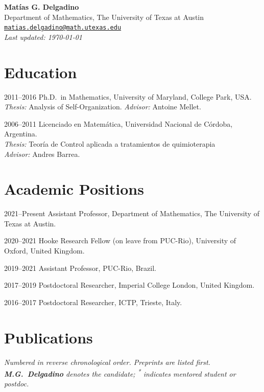 \documentclass[11pt]{article}
\makeatletter
\newcommand{\entry}[2]{%
  \par\addvspace{0.6ex}\noindent
  \begin{list}{}{%
    \setlength{\leftmargin}{1.5in}%
    \setlength{\labelwidth}{1.4in}%
    \setlength{\labelsep}{0.1in}%
  }%
  \item[\textsf{\small #1}] #2
  \end{list}
}
\newcommand{\cvheader}{%
  \begin{center}
    {\LARGE\textbf{Mat\'ias G. Delgadino}}\\[0.6em]
    {\small Department of Mathematics, The University of Texas at Austin}\\[0.2em]
    {\small \href{mailto:matias.delgadino@math.utexas.edu}{\texttt{matias.delgadino@math.utexas.edu}}}\\[0.3em]
    {\footnotesize\itshape Last updated: \today}
  \end{center}
  \vspace{0.5em}
}
\makeatother
\begin{document}
\cvheader

\section{Education}

\entry{2011--2016}{Ph.D.\ in Mathematics, University of Maryland, College Park, USA.\\
\emph{Thesis:} Analysis of Self-Organization. \quad \emph{Advisor:} Antoine Mellet.}

\entry{2006--2011}{Licenciado en Matem\'atica, Universidad Nacional de C\'ordoba, Argentina.\\
\emph{Thesis:} Teor\'ia de Control aplicada a tratamientos de quimioterapia \\
 \emph{Advisor:} Andres Barrea.}

\section{Academic Positions}

\entry{2021--Present}{Assistant Professor, Department of Mathematics, The University of Texas at Austin.}

\entry{2020--2021}{Hooke Research Fellow (on leave from PUC-Rio), University of Oxford, United Kingdom.}

\entry{2019--2021}{Assistant Professor, PUC-Rio, Brazil.}

\entry{2017--2019}{Postdoctoral Researcher, Imperial College London, United Kingdom.}

\entry{2016--2017}{Postdoctoral Researcher, ICTP, Trieste, Italy.}

\section{Publications}

\textit{Numbered in reverse chronological order. Preprints are listed first. \textbf{M.G.~Delgadino} denotes the candidate; \textsuperscript{*} indicates mentored student or postdoc.}\\[0.5em]
\end{document}
